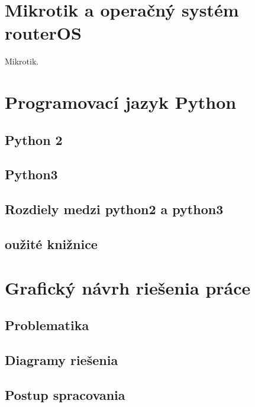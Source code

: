 \chapter{Mikrotik a operačný systém routerOS}
Mikrotik.

\chapter{Programovací jazyk Python}
\section{Python 2}
\section{Python3}
\section{Rozdiely medzi python2 a python3}
\section{oužité knižnice}


\chapter{Grafický návrh riešenia práce}
\section{Problematika}
\section{Diagramy riešenia}
\section{Postup spracovania}